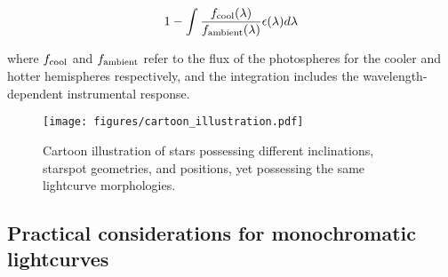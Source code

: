 \documentclass[revtex4]{emulateapj}%
\begin{document}
\begin{equation}
1- \int \frac{f_{\rm cool}(\lambda)}{f_{\rm ambient}(\lambda)} \epsilon(\lambda) d\lambda
\end{equation}

where $f_{\rm cool}$ and $f_{\rm ambient}$ refer to the flux of the photospheres for the cooler and hotter hemispheres respectively, and the integration includes the wavelength-dependent instrumental response.




\begin{figure*}
 \centering
 \texttt{[image: figures/cartoon\_illustration.pdf]}
 \caption{Cartoon illustration of stars possessing different inclinations, starspot geometries, and positions, yet possessing the same lightcurve morphologies.}
 \label{fig:cartoon}
\end{figure*}

\subsection{Practical considerations for monochromatic lightcurves}
\end{document}
